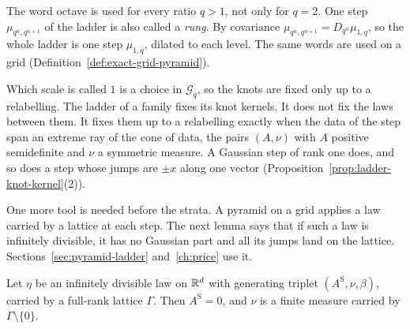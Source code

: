 The word octave is used for every ratio $q > 1$, not only for $q = 2$. One step
$\mu_{q^n,q^{n+1}}$ of the ladder is also called a \emph{rung}. By covariance
$\mu_{q^n,q^{n+1}} = D_{q^n}\mu_{1,q}$, so the whole ladder is one step $\mu_{1,q}$, dilated to
each level. The same words are used on a grid (Definition~\ref{def:exact-grid-pyramid}).

Which scale is called $1$ is a choice in $\mathcal{G}_q$, so the knots are fixed only up to a
relabelling. The ladder of a family fixes its knot kernels. It does not fix the laws between them.
It fixes them up to a relabelling exactly when the data of the step span an extreme ray of the cone
of data, the pairs $(A, \nu)$ with $A$ positive semidefinite and $\nu$ a symmetric \Levy{} measure.
A Gaussian step of rank one does, and so does a step whose jumps are $\pm x$ along one vector
(Proposition~\ref{prop:ladder-knot-kernel}(2)).

One more tool is needed before the strata. A pyramid on a grid applies a law carried by a lattice
at each step. The next lemma says that if such a law is infinitely divisible, it has no Gaussian
part and all its jumps land on the lattice. Sections~\ref{sec:pyramid-ladder} and~\ref{ch:price}
use it.

\begin{lemma}
\label{lem:lattice-infinitely-divisible}

Let $\eta$ be an infinitely divisible law on $\mathbb{R}^d$ with generating triplet $(A^{\mathrm S}, \nu, \beta)$,
carried by a full-rank lattice $\Gamma$. Then $A^{\mathrm S} = 0$, and $\nu$ is a finite measure carried by
$\Gamma \setminus \{0\}$.
\end{lemma}

